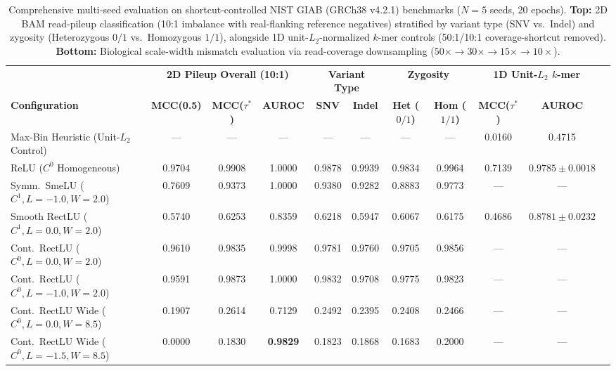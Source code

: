 \begin{table}[t]
\centering
\caption{Comprehensive multi-seed evaluation on shortcut-controlled NIST GIAB (GRCh38 v4.2.1) benchmarks ($N=5$ seeds, 20 epochs). \textbf{Top:} 2D BAM read-pileup classification (10:1 imbalance with real-flanking reference negatives) stratified by variant type (SNV vs.\ Indel) and zygosity (Heterozygous $0/1$ vs.\ Homozygous $1/1$), alongside 1D unit-$L_2$-normalized $k$-mer controls (50:1/10:1 coverage-shortcut removed). \textbf{Bottom:} Biological scale-width mismatch evaluation via read-coverage downsampling ($50\times \to 30\times \to 15\times \to 10\times$).}
\label{tab:real_giab_stratified}
\footnotesize
\setlength{\tabcolsep}{4.2pt}
\renewcommand{\arraystretch}{1.12}
\begin{tabular}{lcccccccccc}
\toprule
& \multicolumn{3}{c}{\textbf{2D Pileup Overall (10:1)}} & \multicolumn{2}{c}{\textbf{Variant Type}} & \multicolumn{2}{c}{\textbf{Zygosity}} & \multicolumn{2}{c}{\textbf{1D Unit-$L_2$ $k$-mer}} \\
\cmidrule(lr){2-4} \cmidrule(lr){5-6} \cmidrule(lr){7-8} \cmidrule(lr){9-10}
\textbf{Configuration} & \textbf{MCC(0.5)} & \textbf{MCC($\tau^*$)} & \textbf{AUROC} & \textbf{SNV} & \textbf{Indel} & \textbf{Het ($0/1$)} & \textbf{Hom ($1/1$)} & \textbf{MCC($\tau^*$)} & \textbf{AUROC} \\
\midrule
Max-Bin Heuristic (Unit-$L_2$ Control) & --- & --- & --- & --- & --- & --- & --- & 0.0160 & 0.4715 \\
ReLU ($C^0$ Homogeneous) & 0.9704 & 0.9908 & 1.0000 & 0.9878 & 0.9939 & 0.9834 & 0.9964 & 0.7139 & $0.9785 \pm 0.0018$ \\
Symm.\ SmeLU ($C^1, L=-1.0, W=2.0$) & 0.7609 & 0.9373 & 1.0000 & 0.9380 & 0.9282 & 0.8883 & 0.9773 & --- & --- \\
Smooth RectLU ($C^1, L=0.0, W=2.0$) & 0.5740 & 0.6253 & 0.8359 & 0.6218 & 0.5947 & 0.6067 & 0.6175 & 0.4686 & $0.8781 \pm 0.0232$ \\
Cont.\ RectLU ($C^0, L=0.0, W=2.0$) & 0.9610 & 0.9835 & 0.9998 & 0.9781 & 0.9760 & 0.9705 & 0.9856 & --- & --- \\
Cont.\ RectLU ($C^0, L=-1.0, W=2.0$) & 0.9591 & 0.9873 & 1.0000 & 0.9832 & 0.9708 & 0.9775 & 0.9823 & --- & --- \\
Cont.\ RectLU Wide ($C^0, L=0.0, W=8.5$) & 0.1907 & 0.2614 & 0.7129 & 0.2492 & 0.2395 & 0.2408 & 0.2466 & --- & --- \\
Cont.\ RectLU Wide ($C^0, L=-1.5, W=8.5$) & 0.0000 & 0.1830 & \textbf{0.9829} & 0.1823 & 0.1868 & 0.1683 & 0.2000 & --- & --- \\

\end{tabular}
\end{table}

